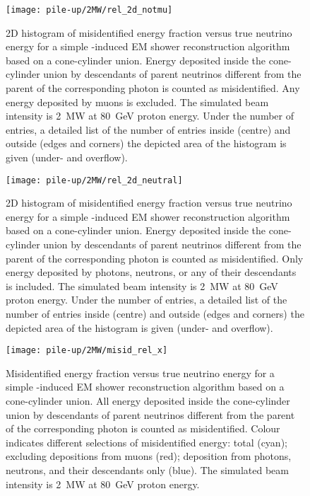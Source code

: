\begin{figure}[htb]
	\centering
	\texttt{[image: pile-up/2MW/rel\_2d\_notmu]}
	\caption{2D histogram of misidentified energy fraction versus true neutrino energy for a simple \Pgpz-induced EM shower reconstruction algorithm based on a cone-cylinder union.
		Energy deposited inside the cone-cylinder union by descendants of parent neutrinos different from the parent of the corresponding \Pgpz photon is counted as misidentified.
		Any energy deposited by muons is excluded.
		The simulated beam intensity is \SI{2}{\mega\watt} at \SI{80}{\giga\electronvolt} proton energy.
		Under the number of entries, a detailed list of the number of entries inside (centre) and outside (edges and corners) the depicted area of the histogram is given (under- and overflow).}
\end{figure}

\begin{figure}[htb]
	\centering
	\texttt{[image: pile-up/2MW/rel\_2d\_neutral]}
	\caption{2D histogram of misidentified energy fraction versus true neutrino energy for a simple \Pgpz-induced EM shower reconstruction algorithm based on a cone-cylinder union.
		Energy deposited inside the cone-cylinder union by descendants of parent neutrinos different from the parent of the corresponding \Pgpz photon is counted as misidentified.
		Only energy deposited by photons, neutrons, or any of their descendants is included.
		The simulated beam intensity is \SI{2}{\mega\watt} at \SI{80}{\giga\electronvolt} proton energy.
		Under the number of entries, a detailed list of the number of entries inside (centre) and outside (edges and corners) the depicted area of the histogram is given (under- and overflow).}
\end{figure}

\begin{figure}[htb]
	\centering
	\texttt{[image: pile-up/2MW/misid\_rel\_x]}
	\caption{Misidentified energy fraction versus true neutrino energy for a simple \Pgpz-induced EM shower reconstruction algorithm based on a cone-cylinder union.
		All energy deposited inside the cone-cylinder union by descendants of parent neutrinos different from the parent of the corresponding \Pgpz photon is counted as misidentified.
		Colour indicates different selections of misidentified energy: total (cyan); excluding depositions from muons (red); deposition from photons, neutrons, and their descendants only (blue).
		The simulated beam intensity is \SI{2}{\mega\watt} at \SI{80}{\giga\electronvolt} proton energy.}
\end{figure}

